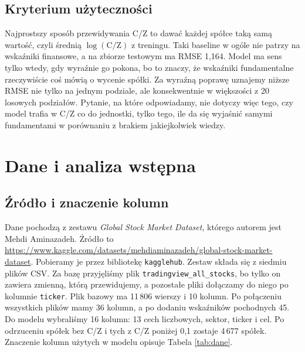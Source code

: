 ﻿\documentclass[10pt,twocolumn,a4paper]{article}
\begin{document}
\subsection{Kryterium użyteczności}
Najprostszy sposób przewidywania C/Z to dawać każdej spółce taką samą wartość, czyli średnią $\log(\text{C/Z})$ z treningu. Taki baseline w ogóle nie patrzy na wskaźniki finansowe, a na zbiorze testowym ma RMSE 1,164. Model ma sens tylko wtedy, gdy wyraźnie go pokona, bo to znaczy, że wskaźniki fundamentalne rzeczywiście coś mówią o wycenie spółki. Za wyraźną poprawę uznajemy niższe RMSE nie tylko na jednym podziale, ale konsekwentnie w większości z 20 losowych podziałów. Pytanie, na które odpowiadamy, nie dotyczy więc tego, czy model trafia w C/Z co do jednostki, tylko tego, ile da się wyjaśnić samymi fundamentami w porównaniu z brakiem jakiejkolwiek wiedzy.

\section{Dane i analiza wstępna}
\subsection{Źródło i znaczenie kolumn}
Dane pochodzą z zestawu \emph{Global Stock Market Dataset}, którego autorem jest Mehdi Aminazadeh. Źródło to \url{https://www.kaggle.com/datasets/mehdiaminazadeh/global-stock-market-dataset}. Pobieramy je przez bibliotekę \texttt{kagglehub}. Zestaw składa się z siedmiu plików CSV. Za bazę przyjęliśmy plik \texttt{tradingview\_all\_stocks}, bo tylko on zawiera zmienną, którą przewidujemy, a pozostałe pliki dołączamy do niego po kolumnie \texttt{ticker}. Plik bazowy ma 11\,806 wierszy i 10 kolumn. Po połączeniu wszystkich plików mamy 36 kolumn, a po dodaniu wskaźników pochodnych 45. Do modelu wybraliśmy 16 kolumn: 13 cech liczbowych, sektor, ticker i cel. Po odrzuceniu spółek bez C/Z i tych z C/Z poniżej 0,1 zostaje 4\,677 spółek. Znaczenie kolumn użytych w modelu opisuje Tabela \ref{tab:dane}.
\end{document}
